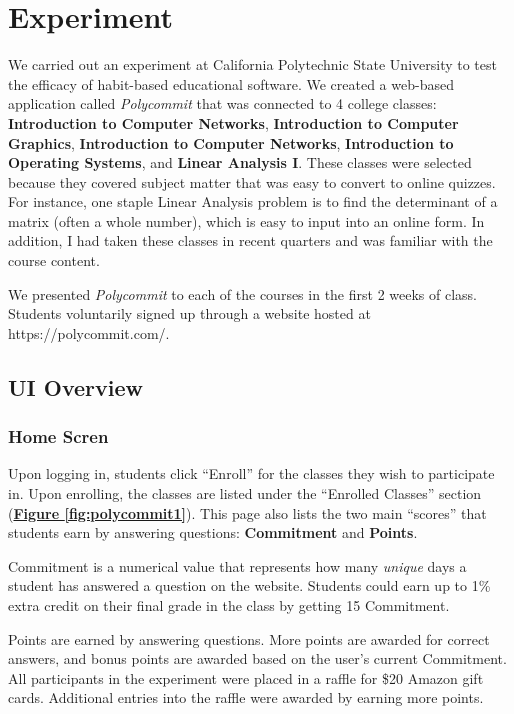 \chapter{Experiment}

\par We carried out an experiment at California Polytechnic State University to test the efficacy of habit-based educational software. We created a web-based application called \textit{Polycommit} that was connected to 4 college classes: \textbf{Introduction to Computer Networks}, \textbf{Introduction to Computer Graphics}, \textbf{Introduction to Computer Networks}, \textbf{Introduction to Operating Systems}, and \textbf{Linear Analysis I}. These classes were selected because they covered subject matter that was easy to convert to online quizzes. For instance, one staple Linear Analysis problem is to find the determinant of a matrix (often a whole number), which is easy to input into an online form. In addition, I had taken these classes in recent quarters and was familiar with the course content.

\par We presented \textit{Polycommit} to each of the courses in the first 2 weeks of class. Students voluntarily signed up through a website hosted at https://polycommit.com/.

\section{UI Overview}

\subsection{Home Scren}
\par Upon logging in, students click ``Enroll'' for the classes they wish to participate in. Upon enrolling, the classes are listed under the ``Enrolled Classes'' section (\textbf{\hyperref[fig:polycommit1]{Figure \ref*{fig:polycommit1}}}). This page also lists the two main ``scores'' that students earn by answering questions: \textbf{Commitment} and \textbf{Points}.

\par Commitment is a numerical value that represents how many \textit{unique} days a student has answered a question on the website. Students could earn up to 1\% extra credit on their final grade in the class by getting 15 Commitment.

\par Points are earned by answering questions. More points are awarded for correct answers, and bonus points are awarded based on the user's current Commitment. All participants in the experiment were placed in a raffle for \$20 Amazon gift cards. Additional entries into the raffle were awarded by earning more points.

